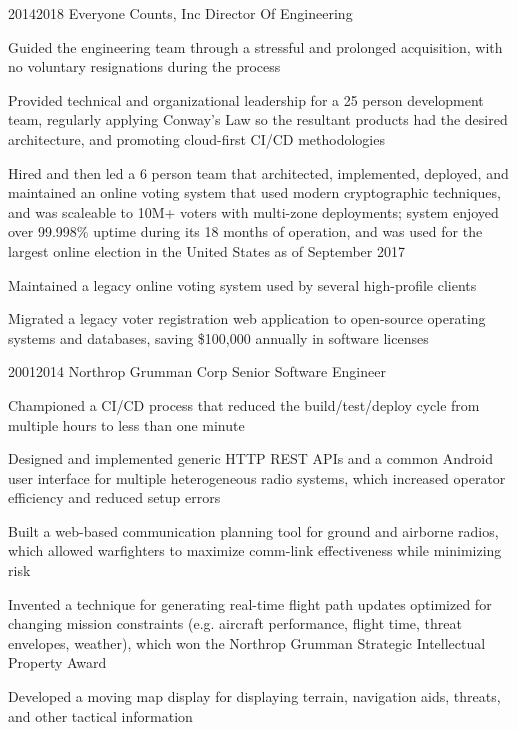 \documentclass{article}
\begin{document}
\job
  {2014}{2018}
  {Everyone Counts, Inc}
  {Director Of Engineering}
  {\begin{achievements}
    \item Guided the engineering team through a stressful and prolonged acquisition, with no voluntary resignations during the process
    \item Provided technical and organizational leadership for a 25 person development team, regularly applying Conway's Law so the resultant products had the desired architecture, and promoting cloud-first CI/CD methodologies
    \item Hired and then led a 6 person team that architected, implemented, deployed, and maintained an online voting system that used modern cryptographic techniques, and was scaleable to 10M+ voters with multi-zone deployments; system enjoyed over 99.998\% uptime during its 18 months of operation, and was used for the largest online election in the United States as of September 2017
    \item Maintained a legacy online voting system used by several high-profile clients
    \item Migrated a legacy voter registration web application to open-source operating systems and databases, saving \$100,000 annually in software licenses
  \end{achievements}}

\job
  {2001}{2014}
  {Northrop Grumman Corp}
  {Senior Software Engineer}
  {\begin{achievements}
    \item Championed a CI/CD process that reduced the build/test/deploy cycle from multiple hours to less than one minute
    \item Designed and implemented generic HTTP REST APIs and a common Android user interface for multiple heterogeneous radio systems, which increased operator efficiency and reduced setup errors
    \item Built a web-based communication planning tool for ground and airborne radios, which allowed warfighters to maximize comm-link effectiveness while minimizing risk
    \item Invented a technique for generating real-time flight path updates optimized for changing mission constraints (e.g. aircraft performance, flight time, threat envelopes, weather), which won the Northrop Grumman Strategic Intellectual Property Award
    \item Developed a moving map display for displaying terrain, navigation aids, threats, and other tactical information
  \end{achievements}}
\end{document}
